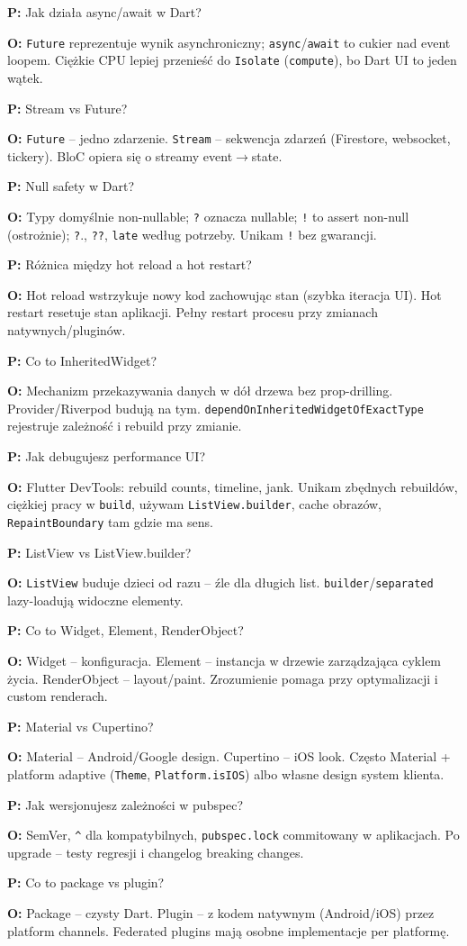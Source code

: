\documentclass[11pt,a4paper]{article}
\newcommand{\pyt}[1]{\par\medskip\noindent\textbf{P:} #1\par}
\newcommand{\odp}[1]{\noindent\textbf{O:} #1\par}
\begin{document}
\pyt{Jak działa async/await w Dart?}
\odp{\texttt{Future} reprezentuje wynik asynchroniczny; \texttt{async}/\texttt{await} to cukier nad event loopem. Ciężkie CPU lepiej przenieść do \texttt{Isolate} (\texttt{compute}), bo Dart UI to jeden wątek.}

\pyt{Stream vs Future?}
\odp{\texttt{Future} -- jedno zdarzenie. \texttt{Stream} -- sekwencja zdarzeń (Firestore, websocket, tickery). BloC opiera się o streamy event$\to$state.}

\pyt{Null safety w Dart?}
\odp{Typy domyślnie non-nullable; \texttt{?} oznacza nullable; \texttt{!} to assert non-null (ostrożnie); \texttt{?}., \texttt{??}, \texttt{late} według potrzeby. Unikam \texttt{!} bez gwarancji.}

\pyt{Różnica między hot reload a hot restart?}
\odp{Hot reload wstrzykuje nowy kod zachowując stan (szybka iteracja UI). Hot restart resetuje stan aplikacji. Pełny restart procesu przy zmianach natywnych/pluginów.}

\pyt{Co to InheritedWidget?}
\odp{Mechanizm przekazywania danych w dół drzewa bez prop-drilling. Provider/Riverpod budują na tym. \texttt{dependOnInheritedWidgetOfExactType} rejestruje zależność i rebuild przy zmianie.}

\pyt{Jak debugujesz performance UI?}
\odp{Flutter DevTools: rebuild counts, timeline, jank. Unikam zbędnych rebuildów, ciężkiej pracy w \texttt{build}, używam \texttt{ListView.builder}, cache obrazów, \texttt{RepaintBoundary} tam gdzie ma sens.}

\pyt{ListView vs ListView.builder?}
\odp{\texttt{ListView} buduje dzieci od razu -- źle dla długich list. \texttt{builder}/\texttt{separated} lazy-loadują widoczne elementy.}

\pyt{Co to Widget, Element, RenderObject?}
\odp{Widget -- konfiguracja. Element -- instancja w drzewie zarządzająca cyklem życia. RenderObject -- layout/paint. Zrozumienie pomaga przy optymalizacji i custom renderach.}

\pyt{Material vs Cupertino?}
\odp{Material -- Android/Google design. Cupertino -- iOS look. Często Material + platform adaptive (\texttt{Theme}, \texttt{Platform.isIOS}) albo własne design system klienta.}

\pyt{Jak wersjonujesz zależności w pubspec?}
\odp{SemVer, \texttt{\^{}} dla kompatybilnych, \texttt{pubspec.lock} commitowany w aplikacjach. Po upgrade -- testy regresji i changelog breaking changes.}

\pyt{Co to package vs plugin?}
\odp{Package -- czysty Dart. Plugin -- z kodem natywnym (Android/iOS) przez platform channels. Federated plugins mają osobne implementacje per platformę.}
\end{document}
